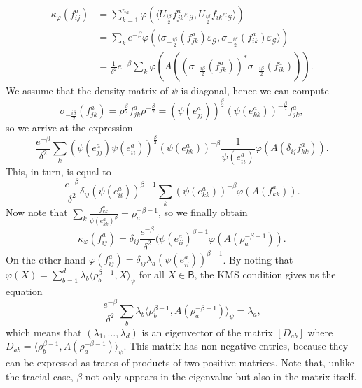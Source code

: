 \documentclass[a4paper,reqno]{amsart}
\numberwithin{equation}{section}
\numberwithin{theorem}{section}
\theoremstyle{definition}\newtheorem{definition}[theorem]{Definition}
\theoremstyle{definition}\newtheorem{remark}[theorem]{Remark}
\theoremstyle{definition}\newtheorem{example}[theorem]{Example}
\theoremstyle{definition}\newtheorem*{notation*}{Notation}
\theoremstyle{definition}\newtheorem*{convention*}{Convention}
\theoremstyle{definition}\newtheorem{observation}{Observation}
\theoremstyle{definition}\newtheorem*{acknowledgment*}{Acknowledgments}
\newcommand{\B}{\mathsf{B}}
\newcommand{\G}{\mathcal{G}}
\begin{document}
 \begin{align*}
\kappa_{\varphi}(f_{ij}^{a}) &= \sum_{k=1}^{n_{a}} \varphi(\langle U_{\frac{i\beta}{2}} f_{jk}^{a}\varepsilon_{\G}, U_{\frac{i\beta}{2}}f_{ik}\varepsilon_{\G}\rangle) \\
&= \sum_{k} e^{-\beta} \varphi(\langle \sigma_{-\frac{i\beta}{2}}(f_{jk}^{a}) \varepsilon_{\G}, \sigma_{-\frac{i \beta}{2}}(f_{ik}^{a}) \varepsilon_{\G}\rangle) \\
&= \frac{1}{\delta^2}e^{-\beta} \sum_{k} \varphi(A( (\sigma_{-\frac{i\beta}{2}}(f_{jk}^{a}))^{\ast} \sigma_{-\frac{i \beta}{2}}(f_{ik}^{a}))).
 \end{align*}
We assume that the density matrix of $\psi$ is diagonal, hence we can compute 
\[\sigma_{-\frac{i\beta}{2}}(f_{jk}^{a}) = \rho^{\frac{\beta}{2}}f_{jk}^{a}\rho^{-\frac{\beta}{2}}=(\psi(e_{jj}^{a}))^{\frac{\beta}{2}} (\psi(e_{kk}^{a}))^{-\frac{\beta}{2}}f_{jk}^{a},\] 
so we arrive at the expression
\[
\frac{e^{-\beta}}{\delta^2} \sum_{k} (\psi(e_{jj}^{a}) \psi(e_{ii}^{a}))^{\frac{\beta}{2}} (\psi(e_{kk}^{a}))^{-\beta} \frac{1}{\psi(e_{ii}^{a})} \varphi(A(\delta_{ij} f_{kk}^{a})).
\]
This, in turn, is equal to 
\[
\frac{e^{-\beta}}{\delta^2} \delta_{ij} (\psi(e_{ii}^{a}))^{\beta-1} \sum_{k} (\psi(e_{kk}^{a}))^{-\beta} \varphi(A(f_{kk}^{a})).
\]
Now note that $\sum_{k} \frac{f_{kk}^{a}}{\psi(e_{kk}^{a})^{\beta}} = \rho_{a}^{-\beta-1}$, so we finally obtain
\[
\kappa_{\varphi}(f_{ij}^{a}) = \delta_{ij} \frac{e^{-\beta}}{\delta^2} (\psi(e_{ii}^{a})^{\beta-1} \varphi(A(\rho_{a}^{-\beta-1})).
\]
On the other hand $\varphi(f_{ij}^{a}) = \delta_{ij}\lambda_{a} (\psi(e_{ii}^{a}))^{\beta-1}$. By noting that $\varphi(X)=\sum_{b=1}^d\lambda_b\langle\rho_b^{\beta-1},X\rangle_\psi$ for all $X\in \B$, the KMS condition gives us the equation
\[
\frac{e^{-\beta}}{\delta^2} \sum_{b} \lambda_{b} \langle \rho_b^{\beta-1}, A (\rho_a^{-\beta-1})\rangle_{\psi} = \lambda_{a}, 
\]
which means that $(\lambda_1,\dots,\lambda_d)$ is an eigenvector of the matrix $[D_{ab}]$ where $D_{ab}= \langle \rho_b^{\beta-1}, A (\rho_a^{-\beta-1})\rangle_{\psi}$. This matrix has non-negative entries, because they can be expressed as traces of products of two positive matrices. Note that, unlike the tracial case, $\beta$ not only appears in the eigenvalue but also in the matrix itself. 
\end{document}
